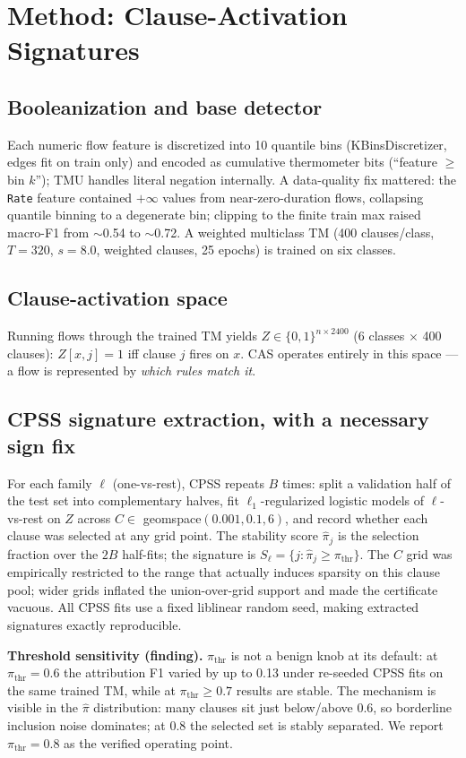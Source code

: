 \documentclass[conference]{IEEEtran}
\begin{document}
\section{Method: Clause-Activation Signatures}
\subsection{Booleanization and base detector}
Each numeric flow feature is discretized into 10 quantile bins
(KBinsDiscretizer, edges fit on train only) and encoded as cumulative
thermometer bits (``feature $\ge$ bin $k$''); TMU handles literal negation
internally. A data-quality fix mattered: the \texttt{Rate} feature contained
$+\infty$ values from near-zero-duration flows, collapsing quantile binning
to a degenerate bin; clipping to the finite train max raised macro-F1 from
$\sim$0.54 to $\sim$0.72. A weighted multiclass TM (400 clauses/class,
$T=320$, $s=8.0$, weighted clauses, 25 epochs) is trained on six classes.

\subsection{Clause-activation space}
Running flows through the trained TM yields $Z \in \{0,1\}^{n \times 2400}$
(6 classes $\times$ 400 clauses): $Z[x,j]=1$ iff clause $j$ fires on $x$.
CAS operates entirely in this space --- a flow is represented by
\emph{which rules match it}.

\subsection{CPSS signature extraction, with a necessary sign fix}
\label{sec:cpss}
For each family $\ell$ (one-vs-rest), CPSS repeats $B$ times: split a
validation half of the test set into complementary halves, fit
$\ell_1$-regularized logistic models of $\ell$-vs-rest on $Z$ across
$C \in$ geomspace$(0.001, 0.1, 6)$, and record whether each clause was
selected at any grid point. The stability score $\hat{\pi}_j$ is the
selection fraction over the $2B$ half-fits; the signature is
$S_\ell = \{j : \hat{\pi}_j \ge \pi_{\mathrm{thr}}\}$. The $C$ grid was
empirically restricted to the range that actually induces sparsity on this
clause pool; wider grids inflated the union-over-grid support and made the
certificate vacuous. All CPSS fits use a fixed liblinear random seed, making
extracted signatures exactly reproducible.

\textbf{Threshold sensitivity (finding).} $\pi_{\mathrm{thr}}$ is not a
benign knob at its default: at $\pi_{\mathrm{thr}}{=}0.6$ the attribution F1
varied by up to 0.13 under re-seeded CPSS fits on the same trained TM, while
at $\pi_{\mathrm{thr}} \ge 0.7$ results are stable. The mechanism is visible
in the $\hat{\pi}$ distribution: many clauses sit just below/above 0.6, so
borderline inclusion noise dominates; at 0.8 the selected set is stably
separated. We report $\pi_{\mathrm{thr}} = 0.8$ as the verified operating
point.
\end{document}

